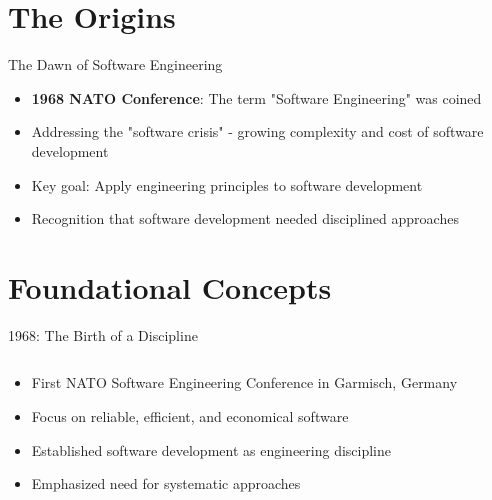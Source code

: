 \documentclass{beamer}
\begin{document}
\section{The Origins}

\begin{frame}{The Dawn of Software Engineering}
\begin{itemize}
    \item \textbf{1968 NATO Conference}: The term "Software Engineering" was coined
    \item Addressing the "software crisis" - growing complexity and cost of software development
    \item Key goal: Apply engineering principles to software development
    \item Recognition that software development needed disciplined approaches
\end{itemize}
\begin{center}
\end{center}
\end{frame}

\section{Foundational Concepts}

\begin{frame}{1968: The Birth of a Discipline}
\begin{columns}
    \begin{column}{0.6\textwidth}
        \begin{itemize}
            \item First NATO Software Engineering Conference in Garmisch, Germany
            \item Focus on reliable, efficient, and economical software
            \item Established software development as engineering discipline
            \item Emphasized need for systematic approaches
        \end{itemize}
    \end{column}
    \begin{column}{0.4\textwidth}
    \end{column}
\end{columns}
\end{frame}
\end{document}
